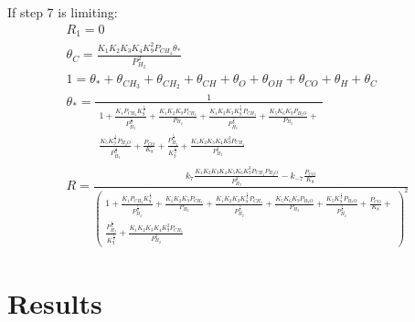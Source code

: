 \documentclass{article}
\begin{document}
If step 7 is limiting:
\begin{eqnarray}
    R_{1} = 0  \\
    \theta_{C}= \frac{K_{1} K_{2} K_{3} K_{4} K_{9}^2 P_{CH_4} \theta_{*}}{P_{H_2}^2}  \\
    1 = \theta_{*}+\theta_{CH_{3}}+\theta_{CH_{2}}+\theta_{CH}+\theta_{O}+\theta_{OH}+\theta_{CO}+\theta_{H}+\theta_{C} \\
    \theta_* = \frac{1}
    {
    \begin{multlined}
    1 + \frac{K_{1} P_{CH_4} K_{9}^{\frac{1}{2}}}{P_{H_2}^{\frac{1}{2}}} + \frac{K_{1} K_{2} K_{9} P_{CH_4}}{P_{H_2}} + \frac{K_{1} K_{2} K_{3} K_{9}^{\frac{3}{2}} P_{CH_4}}{P_{H_2}^{\frac{3}{2}}} + \frac{K_{5} K_{6} K_{9} P_{H_{2}O}}{P_{H_2}} + \\ \frac{K_{5} K_{9}^{\frac{1}{2}} P_{H_{2}O}}{P_{H_2}^\frac{1}{2}} + \frac{P_{CO}}{K_{8}} + \frac{P_{H_2}^{\frac{1}{2}}}{K_{9}^\frac{1}{2}} + \frac{K_{1} K_{2} K_{3} K_{4} K_{9}^2 P_{CH_4}}{P_{H_2}^2}
    \end{multlined}
    } \\
    R = \frac{ k_{7} \frac{K_{1} K_{2} K_{3} K_{4} K_{5} K_{6} K_{9}^3 P_{CH_4} P_{H_{2}O}}{P_{H_2}^3} - k_{-7} \frac{P_{CO}}{K_{8}} }  
    {\left({
    \begin{multlined}
    1 + \frac{K_{1} P_{CH_4} K_{9}^{\frac{1}{2}}}{P_{H_2}^{\frac{1}{2}}} + \frac{K_{1} K_{2} K_{9} P_{CH_4}}{P_{H_2}} + \frac{K_{1} K_{2} K_{3} K_{9}^{\frac{3}{2}} P_{CH_4}}{P_{H_2}^{\frac{3}{2}}} + \frac{K_{5} K_{6} K_{9} P_{H_{2}O}}{P_{H_2}} + \frac{K_{5} K_{9}^{\frac{1}{2}} P_{H_{2}O}}{P_{H_2}^\frac{1}{2}} + \frac{P_{CO}}{K_{8}} +\\ \frac{P_{H_2}^{\frac{1}{2}}}{K_{9}^\frac{1}{2}} + \frac{K_{1} K_{2} K_{3} K_{4} K_{9}^2 P_{CH_4}}{P_{H_2}^2}
    \end{multlined}
    } \right)^2 }
\end{eqnarray}

 
\section{Results}
\end{document}
